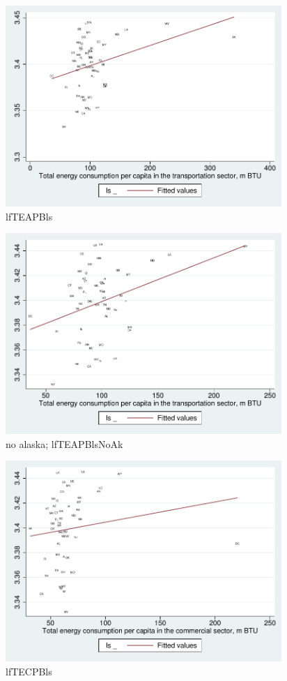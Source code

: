 \documentclass[10pt, letterpaper]{article}
\begin{document}
\begin{spacing}{1.4}
\begin{figure}[H]
 \includegraphics[height=3in]{graphsAndTables/lfTEAPBls.pdf}\centering
\caption{lfTEAPBls}\label{lfTEAPBls}
\end{figure}

\begin{figure}[H]
 \includegraphics[height=3in]{graphsAndTables/lfTEAPBlsNoAk.pdf}\centering
\caption{no alaska; lfTEAPBlsNoAk}\label{lfTEAPBlsNoAk}
\end{figure}

\begin{figure}[H]
 \includegraphics[height=3in]{graphsAndTables/lfTECPBls.pdf}\centering
\caption{lfTECPBls}\label{lfTECPBls}
\end{figure}


\end{spacing}
\end{document}

